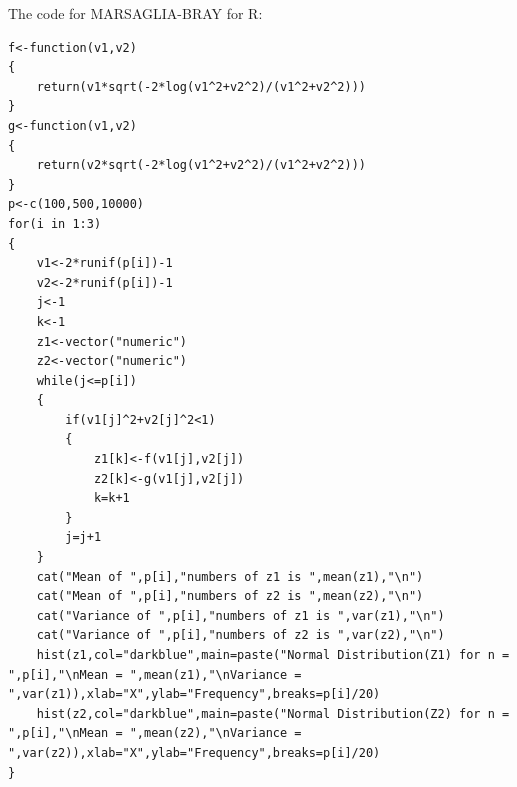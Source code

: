 \documentclass[12pt]{book}
\begin{document}
\begin{figure}[H]
	\centering
\end{figure}
\begin{figure}[H]
	\centering
\end{figure}
\newpage
The code for MARSAGLIA-BRAY for R:\\
\begin{lstlisting}
f<-function(v1,v2)
{
	return(v1*sqrt(-2*log(v1^2+v2^2)/(v1^2+v2^2)))
}
g<-function(v1,v2)
{
	return(v2*sqrt(-2*log(v1^2+v2^2)/(v1^2+v2^2)))
}
p<-c(100,500,10000)
for(i in 1:3)
{
	v1<-2*runif(p[i])-1
	v2<-2*runif(p[i])-1
	j<-1
	k<-1
	z1<-vector("numeric")
	z2<-vector("numeric")
	while(j<=p[i])
	{
		if(v1[j]^2+v2[j]^2<1)
		{
			z1[k]<-f(v1[j],v2[j])
			z2[k]<-g(v1[j],v2[j])
			k=k+1
		}
		j=j+1
	}
	cat("Mean of ",p[i],"numbers of z1 is ",mean(z1),"\n")
	cat("Mean of ",p[i],"numbers of z2 is ",mean(z2),"\n")
	cat("Variance of ",p[i],"numbers of z1 is ",var(z1),"\n")
	cat("Variance of ",p[i],"numbers of z2 is ",var(z2),"\n")
	hist(z1,col="darkblue",main=paste("Normal Distribution(Z1) for n = ",p[i],"\nMean = ",mean(z1),"\nVariance = ",var(z1)),xlab="X",ylab="Frequency",breaks=p[i]/20)
	hist(z2,col="darkblue",main=paste("Normal Distribution(Z2) for n = ",p[i],"\nMean = ",mean(z2),"\nVariance = ",var(z2)),xlab="X",ylab="Frequency",breaks=p[i]/20)
}
\end{lstlisting}
\end{document}
